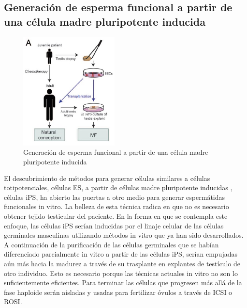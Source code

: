 \documentclass[a4paper,11pt]{article}
\begin{document}
\subsection{Generación de esperma funcional a partir de una célula madre pluripotente inducida}
\begin{figure}[htb!] 
    \caption{Generación de esperma funcional a partir de una célula madre pluripotente inducida}
    \centering 
    \includegraphics[width=5cm]{Cancer-prepuber.jpg}
\end{figure}
El descubrimiento de métodos para generar células similares a células totipotenciales, células ES, a partir de células madre pluripotente inducidas , células iPS, ha abierto las puertas a otro medio para generar espermátidas funcionales in vitro. La belleza de esta técnica radica en que no es necesario obtener tejido testicular del paciente. En la forma en que se contempla este enfoque, las células iPS serían inducidas por el linaje celular de las células germinales masculinas utilizando métodos in vitro que ya han sido desarrollados. 
A continuación de la purificación de las células germinales que se habían diferenciado parcialmente in vitro a partir de las células iPS, serían empujadas aún más hacia la madurez a través de su trasplante en explantes de testículo de otro individuo. Esto es necesario porque las técnicas actuales in vitro no son lo suficientemente eficientes. Para terminar las células que progresen más allá de la fase haploide serán aisladas y usadas para fertilizar óvulos a través de ICSI o ROSI.
\end{document}
